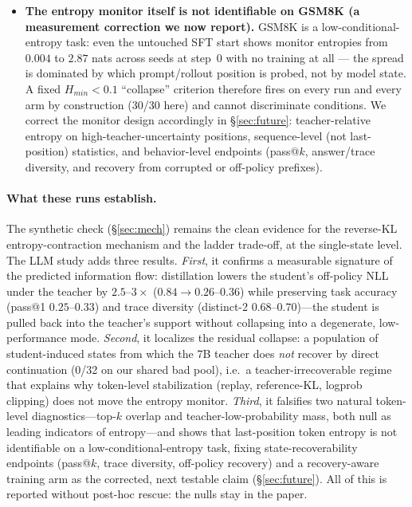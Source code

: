 \documentclass[11pt]{article}
\begin{document}
\begin{itemize}
  \item \textbf{The entropy monitor itself is not identifiable on GSM8K (a measurement correction we now report).} GSM8K is a low-conditional-entropy task: even the untouched SFT start shows monitor entropies from $0.004$ to $2.87$ nats across seeds at step~0 with no training at all --- the spread is dominated by which prompt/rollout position is probed, not by model state. A fixed $H_{min}{<}0.1$ ``collapse'' criterion therefore fires on every run and every arm by construction (30/30 here) and cannot discriminate conditions. We correct the monitor design accordingly in \S\ref{sec:future}: teacher-relative entropy on high-teacher-uncertainty positions, sequence-level (not last-position) statistics, and behavior-level endpoints (pass@$k$, answer/trace diversity, and recovery from corrupted or off-policy prefixes).
\end{itemize}
\paragraph{What these runs establish.} The synthetic check (\S\ref{sec:mech}) remains the clean evidence for the reverse-KL entropy-contraction mechanism and the ladder trade-off, at the single-state level. The LLM study adds three results. \emph{First}, it confirms a measurable signature of the predicted information flow: distillation lowers the student's off-policy NLL under the teacher by $2.5$--$3\times$ ($0.84\!\to\!0.26$--$0.36$) while preserving task accuracy (pass@1 $0.25$--$0.33$) and trace diversity (distinct-2 $0.68$--$0.70$)---the student is pulled back into the teacher's support without collapsing into a degenerate, low-performance mode. \emph{Second}, it localizes the residual collapse: a population of student-induced states from which the 7B teacher does \emph{not} recover by direct continuation (0/32 on our shared bad pool), i.e.\ a teacher-irrecoverable regime that explains why token-level stabilization (replay, reference-KL, logprob clipping) does not move the entropy monitor. \emph{Third}, it falsifies two natural token-level diagnostics---top-$k$ overlap and teacher-low-probability mass, both null as leading indicators of entropy---and shows that last-position token entropy is not identifiable on a low-conditional-entropy task, fixing state-recoverability endpoints (pass@$k$, trace diversity, off-policy recovery) and a recovery-aware training arm as the corrected, next testable claim (\S\ref{sec:future}). All of this is reported without post-hoc rescue: the nulls stay in the paper.
\end{document}
